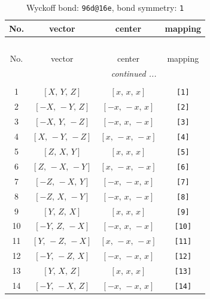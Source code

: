 \documentclass[fleqn,8pt]{jsarticle}
\begin{document}
\begin{longtable}{cccc}
\caption{Wyckoff bond: {\tt 96d@16e}, bond symmetry: {\tt 1}}
 \\
 \hline \hline
No. & vector & center & mapping \\ \hline \endfirsthead

\multicolumn{3}{l}{\tablename\ \thetable{}} \\
 \hline \hline
No. & vector & center & mapping \\ \hline \endhead

 \hline \hline
\multicolumn{3}{r}{\footnotesize\it continued ...} \\ \endfoot

 \hline \hline
\multicolumn{3}{r}{} \\ \endlastfoot

1 & $\left[ X,\, Y,\, Z \right]$ & $\left[ x,\, x,\, x \right]$ & {\tt [1]} \\ \hline
2 & $\left[ - X,\, - Y,\, Z \right]$ & $\left[ - x,\, - x,\, x \right]$ & {\tt [2]} \\ \hline
3 & $\left[ - X,\, Y,\, - Z \right]$ & $\left[ - x,\, x,\, - x \right]$ & {\tt [3]} \\ \hline
4 & $\left[ X,\, - Y,\, - Z \right]$ & $\left[ x,\, - x,\, - x \right]$ & {\tt [4]} \\ \hline
5 & $\left[ Z,\, X,\, Y \right]$ & $\left[ x,\, x,\, x \right]$ & {\tt [5]} \\ \hline
6 & $\left[ Z,\, - X,\, - Y \right]$ & $\left[ x,\, - x,\, - x \right]$ & {\tt [6]} \\ \hline
7 & $\left[ - Z,\, - X,\, Y \right]$ & $\left[ - x,\, - x,\, x \right]$ & {\tt [7]} \\ \hline
8 & $\left[ - Z,\, X,\, - Y \right]$ & $\left[ - x,\, x,\, - x \right]$ & {\tt [8]} \\ \hline
9 & $\left[ Y,\, Z,\, X \right]$ & $\left[ x,\, x,\, x \right]$ & {\tt [9]} \\ \hline
10 & $\left[ - Y,\, Z,\, - X \right]$ & $\left[ - x,\, x,\, - x \right]$ & {\tt [10]} \\ \hline
11 & $\left[ Y,\, - Z,\, - X \right]$ & $\left[ x,\, - x,\, - x \right]$ & {\tt [11]} \\ \hline
12 & $\left[ - Y,\, - Z,\, X \right]$ & $\left[ - x,\, - x,\, x \right]$ & {\tt [12]} \\ \hline
13 & $\left[ Y,\, X,\, Z \right]$ & $\left[ x,\, x,\, x \right]$ & {\tt [13]} \\ \hline
14 & $\left[ - Y,\, - X,\, Z \right]$ & $\left[ - x,\, - x,\, x \right]$ & {\tt [14]} \\ \hline

\end{longtable}
\end{document}
